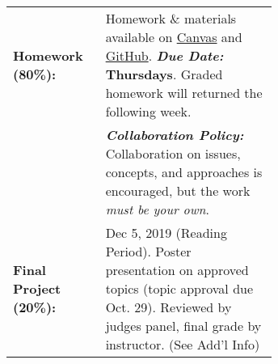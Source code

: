 \begin{tabular}{l p{0.65\linewidth}}
 
\textbf{Homework (80\%):}       &  Homework \& materials 
                                   available on \href{\CanvasURL}{Canvas} and
                                   \href{\GitHubURL}{GitHub}. \emph{\textbf{Due Date:}} \textbf{Thursdays}. 
                                  Graded homework will returned the following week. \\
                                & \emph{\textbf{Collaboration Policy:}} Collaboration on issues,
                                  concepts, and approaches is encouraged, but the work
                                  \textit{must be your own}.\\

\textbf{Final Project (20\%):}  & Dec 5, 2019 (Reading Period). Poster presentation on approved topics (topic approval due Oct. 29). Reviewed by judges panel, final grade by instructor. (See Add'l Info) \\

\end{tabular}